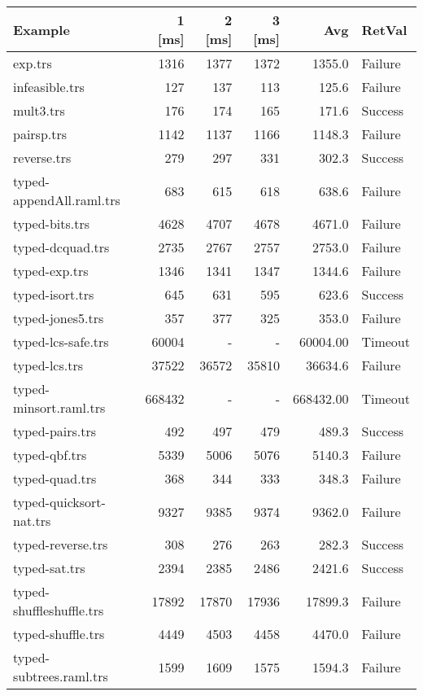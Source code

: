 \documentclass[11pt]{article}
\begin{document}
\begin{center}
\begin{tabular}{lrrrrl}
Example & 1 [ms] & 2 [ms] & 3 [ms] & Avg & RetVal\\
\hline
exp.trs & 1316 & 1377 & 1372 & 1355.0 & Failure\\
infeasible.trs & 127 & 137 & 113 & 125.6 & Failure\\
mult3.trs & 176 & 174 & 165 & 171.6 & Success\\
pairsp.trs & 1142 & 1137 & 1166 & 1148.3 & Failure\\
reverse.trs & 279 & 297 & 331 & 302.3 & Success\\
typed-appendAll.raml.trs & 683 & 615 & 618 & 638.6 & Failure\\
typed-bits.trs & 4628 & 4707 & 4678 & 4671.0 & Failure\\
typed-dcquad.trs & 2735 & 2767 & 2757 & 2753.0 & Failure\\
typed-exp.trs & 1346 & 1341 & 1347 & 1344.6 & Failure\\
typed-isort.trs & 645 & 631 & 595 & 623.6 & Success\\
typed-jones5.trs & 357 & 377 & 325 & 353.0 & Failure\\
typed-lcs-safe.trs & 60004 & - & - & 60004.00 & Timeout\\
typed-lcs.trs & 37522 & 36572 & 35810 & 36634.6 & Failure\\
typed-minsort.raml.trs & 668432 & - & - & 668432.00 & Timeout\\
typed-pairs.trs & 492 & 497 & 479 & 489.3 & Success\\
typed-qbf.trs & 5339 & 5006 & 5076 & 5140.3 & Failure\\
typed-quad.trs & 368 & 344 & 333 & 348.3 & Failure\\
typed-quicksort-nat.trs & 9327 & 9385 & 9374 & 9362.0 & Failure\\
typed-reverse.trs & 308 & 276 & 263 & 282.3 & Success\\
typed-sat.trs & 2394 & 2385 & 2486 & 2421.6 & Success\\
typed-shuffleshuffle.trs & 17892 & 17870 & 17936 & 17899.3 & Failure\\
typed-shuffle.trs & 4449 & 4503 & 4458 & 4470.0 & Failure\\
typed-subtrees.raml.trs & 1599 & 1609 & 1575 & 1594.3 & Failure\\
\end{tabular}

\end{center}
\end{document}
